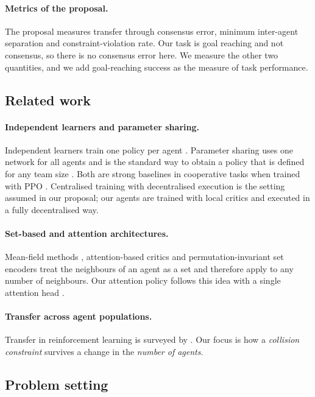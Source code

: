 \paragraph{Metrics of the proposal.}
The proposal measures transfer through consensus error, minimum inter-agent separation and constraint-violation
rate. Our task is goal reaching and not consensus, so there is no consensus error here. We measure the other two
quantities, and we add goal-reaching success as the measure of task performance.

\subsection{Related work}
\label{sec:pt-related}
\paragraph{Independent learners and parameter sharing.}
Independent learners train one policy per agent \citep{tan1993}. Parameter sharing uses one network for all agents
and is the standard way to obtain a policy that is defined for any team size \citep{gupta2017}. Both are strong
baselines in cooperative tasks when trained with PPO \citep{dewitt2020,yu2022}. Centralised training with
decentralised execution \citep{lowe2017,foerster2016} is the setting assumed in our proposal; our agents are
trained with local critics and executed in a fully decentralised way.

\paragraph{Set-based and attention architectures.}
Mean-field methods \citep{yang2018}, attention-based critics \citep{iqbal2019} and permutation-invariant set
encoders \citep{zaheer2017} treat the neighbours of an agent as a set and therefore apply to any number of
neighbours. Our attention policy follows this idea with a single attention head \citep{vaswani2017}.

\paragraph{Transfer across agent populations.}
Transfer in reinforcement learning is surveyed by \citet{taylor2009}. Our focus is how a \emph{collision
constraint} survives a change in the \emph{number of agents}.

\subsection{Problem setting}
\label{sec:pt-setting}
